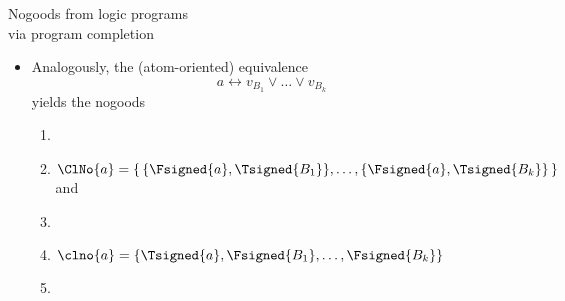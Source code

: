 \begin{frame}{Nogoods from logic programs\\[-1ex]\normalsize via program completion}

  \begin{itemize}
  \item Analogously, the (atom-oriented) equivalence
    \[
    a \leftrightarrow v_{B_1} \vee \dots \vee v_{B_k}
    \]
    yields the nogoods
    \begin{enumerate}
    \item []
    \item
      \(
      \ClNo{a} = \{\,\{\Fsigned{a},\Tsigned{B_1}\},\dots,\{\Fsigned{a},\Tsigned{B_k}\}\,\}
      \)
      and
    \item []
    \item
      \(
      \clno{a} = \{\Tsigned{a},\Fsigned{B_1},\dots,\Fsigned{B_k}\}
      \)
    \item []
    \end{enumerate}
  \end{itemize}
\end{frame}
